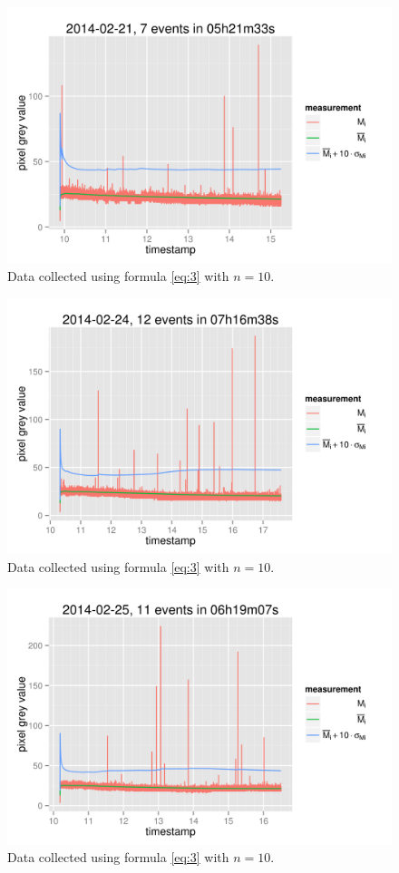 \documentclass[a4paper,12pt]{article}
\begin{document}
\begin{figure}[h!]
  \centering
  \includegraphics{20140221.png}
  \caption{Data collected using formula \ref{eq:3} with $n=10$.}
\end{figure}

\begin{figure}[h!]
  \centering
  \includegraphics{20140224.png}
  \caption{Data collected using formula \ref{eq:3} with $n=10$.}
\end{figure}

\begin{figure}[h!]
  \centering
  \includegraphics{20140225.png}
  \caption{Data collected using formula \ref{eq:3} with $n=10$.}
\end{figure}
\end{document}
